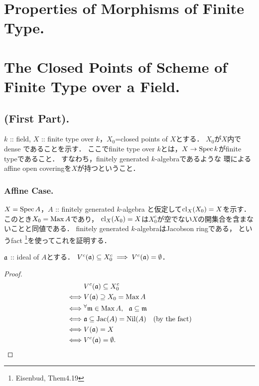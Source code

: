 \documentclass[a4paper]{jsarticle}
\begin{document}
\section{Properties of Morphisms of Finite Type.} %

\section{The Closed Points of Scheme of Finite Type over a Field.} %
    \subsection{(First Part).}
    $k$ :: field,
    $X$ :: finite type over $k$，$X_0$=closed points of $X$とする．
    $X_0$が$X$内でdense であることを示す．
    ここでfinite type over $k$とは，$X \to \operatorname{Spec} k$がfinite typeであること．
    すなわち，finitely generated $k$-algebraであるような
    環によるaffine open coveringを$X$が持つということ．

    \subsubsection{Affine Case.}
    $X=\operatorname{Spec} A$，$A$ :: finitely generated $k$-algebra
    と仮定して$\operatorname{cl}_X(X_0)=X$を示す．
    このとき$X_0=\operatorname{Max} A$であり，
    $\operatorname{cl}_X(X_0)=X$は$X_0^c$が空でない$X$の開集合を含まないことと同値である．
    finitely generated $k$-algebraはJacobson ringである，
    というfact \footnote{Eisenbud, Them4.19}を使ってこれを証明する．
    \begin{Claim}
        $\mathfrak{a}$ :: ideal of $A$とする．
        $V^c(\mathfrak{a}) \subseteq X_0^c \implies V^c(\mathfrak{a})=\emptyset$．
    \end{Claim}
    \begin{proof}
    \begin{align*}
        {}&     V^c(\mathfrak{a}) \subseteq X_0^c \\
        \iff&   V(\mathfrak{a}) \supseteq X_0=\operatorname{Max} A \\
        \iff&   {}^{\forall} \mathfrak{m} \in \operatorname{Max} A,~~ \mathfrak{a} \subseteq \mathfrak{m} \\
        \iff&   \mathfrak{a} \subseteq \operatorname{Jac}(A)=\operatorname{Nil}(A) ~~~(\text{by the fact}) \\
        \iff&   V(\mathfrak{a})=X \\
        \iff&   V^c(\mathfrak{a})=\emptyset.
    \end{align*}
    \end{proof}
\end{document}
